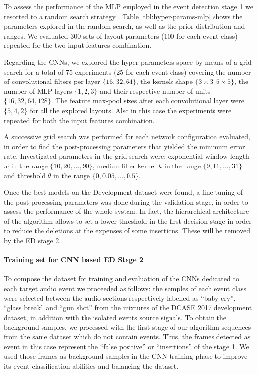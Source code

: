 To assess the performance of the MLP employed in the event detection stage 1 we resorted to a random search strategy \cite{bergstra2012random}.
Table \ref{tbl:hyper-params-mlp} shows the parameters explored in the random search, as well as the prior distribution and ranges. We evaluated 300 sets of layout parameters (100 for each event class) repeated for the two input features combination.

Regarding the CNNs, we explored the hyper-parameters space by means of a grid search for a total of 75 experiments (25 for each event class) covering the number of convolutional filters per layer $\{16,32,64\}$, the kernels shape $\{3 \times 3, 5 \times 5\}$, the number of MLP layers $\{1,2,3\}$ and their respective number of units $\{16,32,64,128\}$. The feature
max-pool sizes after each convolutional layer were $\{5,4,2\}$ for all the explored layouts. Also in this case the experiments were repeated for both the input features combination.

A successive grid search was performed for each network configuration evaluated, in order to find the post-processing parameters that yielded the minimum error rate. Investigated parameters in the grid search were: exponential window length $w$ in the range $\{10,20,\dots,90\}$, median filter kernel $k$ in the range $\{9,11,\dots,31\}$ and threshold $\theta$ in the range $\{0,0.05,\dots,0.5\}$. 

Once the best models on the Development dataset were found, a fine tuning of the post processing parameters was done during the validation stage, in order to assess the performance of the whole system. In fact, the hierarchical architecture of the algorithm allows to set a lower threshold in the first decision stage in order to reduce the deletions at the expenses of some insertions. These will be removed by the ED stage 2. 



\paragraph{Training set for CNN based ED Stage 2 }
To compose the dataset for training and evaluation of the CNNs dedicated to each target audio event we proceeded as follows: the samples of each event class were selected between the audio sections respectively labelled as ``baby cry'', ``glass break'' and ``gun shot'' from the mixtures of the DCASE 2017 development dataset, in addition with the isolated events source signals. To obtain the background samples, we processed with the first stage of our algorithm sequences from the same dataset which do not contain events. 
Thus, the frames detected as event in this case represent the ``false positive'' or ``insertions'' of the stage 1. 
We used those frames as background samples in the CNN training phase to improve its event classification abilities and balancing the dataset. 

